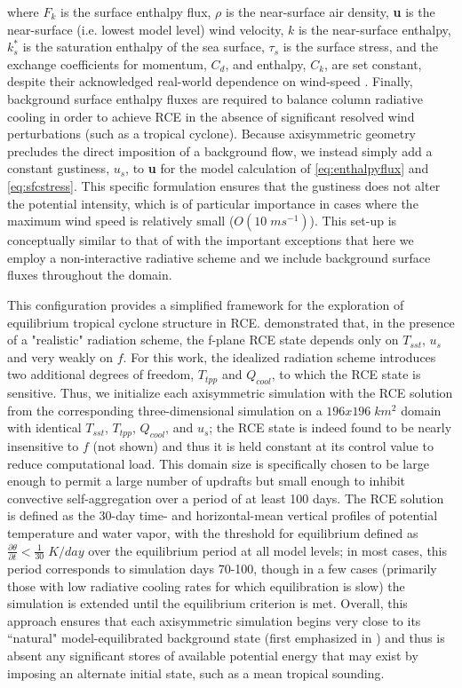 \documentclass[12pt]{article}
\begin{document}
where $F_k$ is the surface enthalpy flux, $\rho$ is the near-surface air density, {\bf u} is the near-surface (i.e. lowest model level) wind velocity, $k$ is the near-surface enthalpy, $k^*_s$ is the saturation enthalpy of the sea surface, $\tau_s$ is the surface stress, and the exchange coefficients for momentum, $C_d$, and enthalpy, $C_k$, are set constant, despite their acknowledged real-world dependence on wind-speed \citep{Powell_Vickery_Reinhold_2003}. Finally, background surface enthalpy fluxes are required to balance column radiative cooling in order to achieve RCE in the absence of significant resolved wind perturbations (such as a tropical cyclone). Because axisymmetric geometry precludes the direct imposition of a background flow, we instead simply add a constant gustiness, $u_s$, to {\bf u} for the model calculation of \eqref{eq:enthalpyflux} and \eqref{eq:sfcstress}. This specific formulation ensures that the gustiness does not alter the potential intensity, which is of particular importance in cases where the maximum wind speed is relatively small ($O(10 \; ms^{-1})$). This set-up is conceptually similar to that of \cite{Hakim_2011} with the important exceptions that here we employ a non-interactive radiative scheme and we include background surface fluxes throughout the domain.

This configuration provides a simplified framework for the exploration of equilibrium tropical cyclone structure in RCE. \cite{Nolan_Rappin_Emanuel_2007} demonstrated that, in the presence of a "realistic" radiation scheme, the f-plane RCE state depends only on $T_{sst}$, $u_s$ and very weakly on $f$. For this work, the idealized radiation scheme introduces two additional degrees of freedom, $T_{tpp}$ and $Q_{cool}$, to which the RCE state is sensitive. Thus, we initialize each axisymmetric simulation with the RCE solution from the corresponding three-dimensional simulation on a $196 x 196 \; km^2$ domain with identical $T_{sst}$, $T_{tpp}$, $Q_{cool}$, and $u_s$; the RCE state is indeed found to be nearly insensitive to $f$ (not shown) and thus it is held constant at its control value to reduce computational load. This domain size is specifically chosen to be large enough to permit a large number of updrafts but small enough to inhibit convective self-aggregation \citep{Bretherton_Blossey_Khairoutdinov_2005} over a period of at least 100 days. The RCE solution is defined as the 30-day time- and horizontal-mean vertical profiles of potential temperature and water vapor, with the threshold for equilibrium defined as $\frac{\partial \theta}{\partial t} < \frac{1}{30} \; K / day$ over the equilibrium period at all model levels; in most cases, this period corresponds to simulation days 70-100, though in a few cases (primarily those with low radiative cooling rates for which equilibration is slow) the simulation is extended until the equilibrium criterion is met. Overall, this approach ensures that each axisymmetric simulation begins very close to its ``natural" model-equilibrated background state (first emphasized in \cite{Rotunno_Emanuel_1987}) and thus is absent any significant stores of available potential energy that may exist by imposing an alternate initial state, such as a mean tropical sounding.
\end{document}
